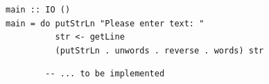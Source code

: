 \documentclass[unknownkeysallowed]{beamer}
\begin{document}
  \begin{frame}[fragile]

  \begin{verbatim}
main :: IO ()
main = do putStrLn "Please enter text: "
          str <- getLine
          (putStrLn . unwords . reverse . words) str
  \end{verbatim}
\end{frame}



  \begin{frame}[fragile]

  \begin{verbatim}
        -- ... to be implemented
  \end{verbatim}
\end{frame}
  
\end{document}
